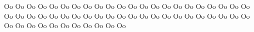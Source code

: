 \documentclass{worksheet}
\begin{document}
\begin{drillsheet}
\calligra
Oo Oo Oo Oo Oo Oo Oo Oo Oo Oo Oo Oo Oo Oo Oo Oo Oo Oo Oo Oo Oo Oo Oo Oo Oo Oo Oo Oo Oo Oo Oo Oo Oo Oo Oo Oo Oo Oo Oo Oo Oo Oo Oo Oo Oo Oo Oo Oo Oo Oo Oo Oo Oo Oo Oo
\end{drillsheet}
\end{document}
